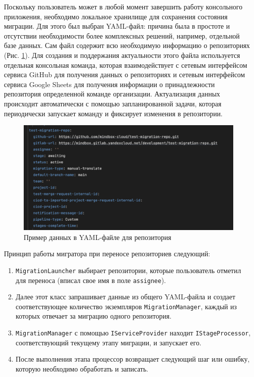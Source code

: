 Поскольку пользователь может в любой момент завершить работу консольного приложения, необходимо локальное хранилище для сохранения состояния миграции.
Для этого был выбран YAML-файл: причина была в простоте и отсутствии необходимости более комплексных решений, например, отдельной базе данных.
Сам файл содержит всю необходимую информацию о репозиториях (Рис. \ref{fig:migration-state-file}).
Для создания и поддержания актуальности этого файла используется отдельная консольная команда,
которая взаимодействует с сетевым интерфейсом сервиса GitHub для получения данных о репозиториях и сетевым интерфейсом сервиса Google Sheets для получения информации о принадлежности репозитория определенной команде организации.
Актуализация данных происходит автоматически с помощью запланированной задачи, которая периодически запускает команду и фиксирует изменения в репозитории.

\begin{figure}[H]
  \centering
  \includegraphics[width=12cm]{img/migration-state-file}
  \caption{Пример данных в YAML-файле для репозитория}
  \label{fig:migration-state-file}
\end{figure}

Принцип работы мигратора при переносе репозиториев следующий:
\begin{enumerate}
  \item \texttt{MigrationLauncher} выбирает репозитории, которые пользователь отметил для переноса (вписал свое имя в поле \texttt{assignee}).
  \item Далее этот класс запрашивает данные из общего YAML-файла и создает соответствующее количество экземпляров \texttt{MigrationManager},
        каждый из которых отвечает за миграцию одного репозитория.
  \item \texttt{MigrationManager} с помощью \texttt{IServiceProvider} находит \texttt{IStageProcessor},
        соответствующий текущему этапу миграции, и запускает его.
  \item После выполнения этапа процессор возвращает следующий шаг или ошибку, которую необходимо обработать и записать.
\end{enumerate}

